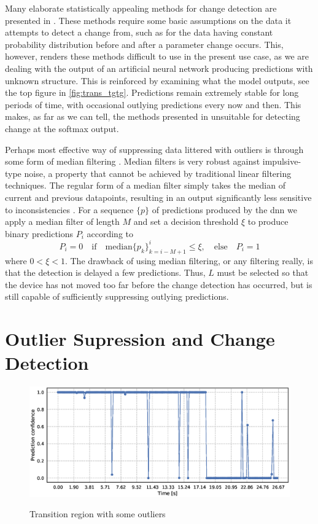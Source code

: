 Many elaborate statistically appealing methods for change detection are presented in \citep{basseville_nikiforov_1993}. These methods require some basic assumptions on the data it attempts to detect a change from, such as for the data having constant probability distribution before and after a parameter change occurs. This, however, renders these methods difficult to use in the present use case, as we are dealing with the output of an artificial neural network producing predictions with unknown structure. This is reinforced by examining what the model outputs, see the top figure in \ref{fig:trans_tgtg}. Predictions remain extremely stable for long periods of time, with occasional outlying predictions every now and then. This makes, as far as we can tell, the methods presented in \citep{basseville_nikiforov_1993} unsuitable for detecting change at the softmax output.

Perhaps most effective way of suppressing data littered with outliers is through some form of median filtering \citep{yin_yang_gabbouj_neuvo_1996}. Median filters is very robust against impulsive-type noise, a property that cannot be achieved by traditional linear filtering techniques. The regular form of a median filter simply takes the median of current and previous datapoints, resulting in an output significantly less sensitive to inconsistencies \citep{pearson_2002}. For a sequence $\{p\}$ of predictions produced by the \gls{dnn} we apply a median filter of length $M$ and set a decision threshold $\xi$ to produce binary predictions $P_i$ according to
\citep{yin_yang_gabbouj_neuvo_1996}
\begin{equation}
	P_i=0 \quad\text{if}\quad\text{median}\{p_k\}_{k=i-M+1}^i\leq\xi, 
	\quad \text{else} \quad P_i = 1
\end{equation}
where $0<\xi<1$. The drawback of using median filtering, or any filtering really, is that the detection is delayed a few predictions. Thus, $L$ must be selected so that the device has not moved too far before the change detection has occurred, but is still capable of sufficiently  suppressing outlying predictions. 


\iffalse
\section{Outlier Supression and Change Detection}


\begin{figure}
	\includegraphics[scale=0.5]{figs_temp/detect_nothing}
	\label{fig:detect_no}
	\caption{Transition region with some outliers}
\end{figure}

